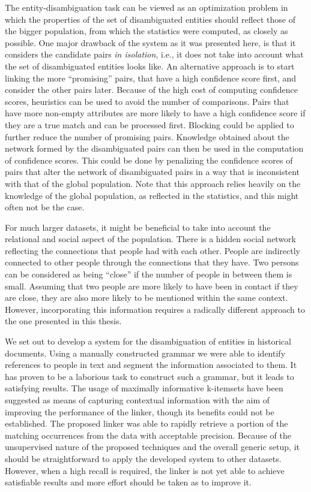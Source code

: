 The entity-disambiguation task can be viewed as an optimization problem in which the properties of the set of disambiguated entities should reflect those of the bigger population, from which the statistics were computed, as closely as possible.
One major drawback of the system as it was presented here, is that it considers the candidate pairs \emph{in isolation}, i.e., it does not take into account what the set of disambiguated entities looks like.
An alternative approach is to start linking the more ``promising'' pairs, that have a high confidence score first, and consider the other pairs later.
Because of the high cost of computing confidence scores, heuristics can be used to avoid the number of comparisons.
Pairs that have more non-empty attributes are more likely to have a high confidence score if they are a true match and can be processed first.
Blocking could be applied to further reduce the number of promising pairs.
Knowledge obtained about the network formed by the disambiguated pairs can then be used in the computation of confidence scores.
This could be done by penalizing the confidence scores of pairs that alter the network of disambiguated pairs in a way that is inconsistent with that of the global population.
Note that this approach relies heavily on the knowledge of the global population, as reflected in the statistics, and this might often not be the case.

For much larger datasets, it might be beneficial to take into account the relational and social aspect of the population.
There is a hidden social network reflecting the connections that people had with each other.
People are indirectly connected to other people through the connections that they have.
Two persons can be considered as being ``close'' if the number of people in between them is small.
Assuming that two people are more likely to have been in contact if they are close, they are also more likely to be mentioned within the same context.
However, incorporating this information requires a radically different approach to the one presented in this thesis.

We set out to develop a system for the disambiguation of entities in historical documents.
Using a manually constructed grammar we were able to identify references to people in text and segment the information associated to them.
It has proven to be a laborious task to construct such a grammar, but it leads to satisfying results.
The usage of maximally informative k-itemsets have been suggested as means of capturing contextual information with the aim of improving the performance of the linker, though its benefits could not be established.
The proposed linker was able to rapidly retrieve a portion of the matching occurrences from the data with acceptable precision.
Because of the unsupervised nature of the proposed techniques and the overall generic setup, it should be straightforward to apply the developed system to other datasets.
However, when a high recall is required, the linker is not yet able to achieve satisfiable results and more effort should be taken as to improve it.
